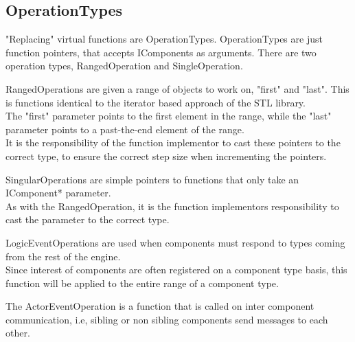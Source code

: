 \subsection{OperationTypes}

"Replacing" virtual functions are OperationTypes.
OperationTypes are just function pointers, that accepts IComponents as arguments.
There are two operation types, RangedOperation and SingleOperation.

RangedOperations are given a range of objects to work on, "first" and "last".
This is functions identical to the iterator based approach of the STL library.\\
The "first" parameter points to the first element in the range, while the "last" parameter points to a past-the-end element of the range.\\
It is the responsibility of the function implementor to cast these pointers to the correct type, 
to ensure the correct step size when incrementing the pointers.

SingularOperations are simple pointers to functions that only take an IComponent* parameter.\\
As with the RangedOperation, it is the function implementors responsibility to cast the parameter to the correct type.

LogicEventOperations are used when components must respond to types coming from the rest of the engine.\\
Since interest of components are often registered on a component type basis,
this function will be applied to the entire range of a component type.

The ActorEventOperation is a function that is called on inter component communication, i.e, 
sibling or non sibling components send messages to each other.
